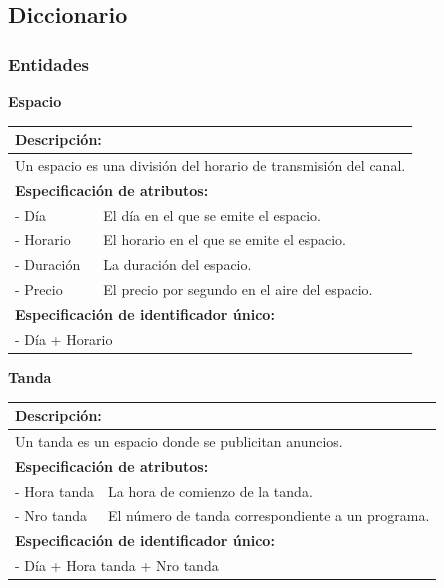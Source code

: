 \documentclass[a4paper,10pt]{article}
\begin{document}
  \subsection{Diccionario}
    \subsubsection{Entidades}
    \begin{flushleft}
      \begin{large} \bf{Espacio} \end{large}
    \end{flushleft}
      \begin{tabular}{| p{2cm} | p{9cm} |}
	\hline
	\multicolumn{2}{|l|}{\bf{Descripci\'on:}} \\
	\hline
	\multicolumn{2}{|l|}{Un espacio es una divisi\'on del horario de transmisi\'on del canal.} \\
	\hline	
	\multicolumn{2}{|l|}{\bf{Especificaci\'on de atributos:}} \\
	\hline
	- D\'ia & El d\'ia en el que se emite el espacio. \\
	\hline \hline
	- Horario & El horario en el que se emite el espacio. \\
	\hline \hline
	- Duraci\'on & La duraci\'on del espacio.\\
	\hline \hline
	- Precio & El precio por segundo en el aire del espacio.\\
	\hline
	\multicolumn{2}{|l|}{\bf{Especificaci\'on de identificador \'unico:}} \\
	\hline
	\multicolumn{2}{|l|}{- D\'ia + Horario} \\
	\hline
      \end{tabular}
    
    \begin{flushleft}
      \begin{large} \bf{Tanda} \end{large}
    \end{flushleft}
      \begin{tabular}{| p{2cm} | p{9cm} |}
	\hline
	\multicolumn{2}{|l|}{\bf{Descripci\'on:}} \\
	\hline
	\multicolumn{2}{|l|}{Un tanda es un espacio donde se publicitan anuncios.} \\
	\hline	
	\multicolumn{2}{|l|}{\bf{Especificaci\'on de atributos:}} \\
	\hline
	- Hora tanda & La hora de comienzo de la tanda. \\
	\hline \hline
	- Nro tanda & El n\'umero de tanda correspondiente a un programa. \\
	\hline
	\multicolumn{2}{|l|}{\bf{Especificaci\'on de identificador \'unico:}} \\
	\hline
	\multicolumn{2}{|l|}{- D\'ia + Hora tanda + Nro tanda} \\
	\hline
      \end{tabular}
\end{document}
